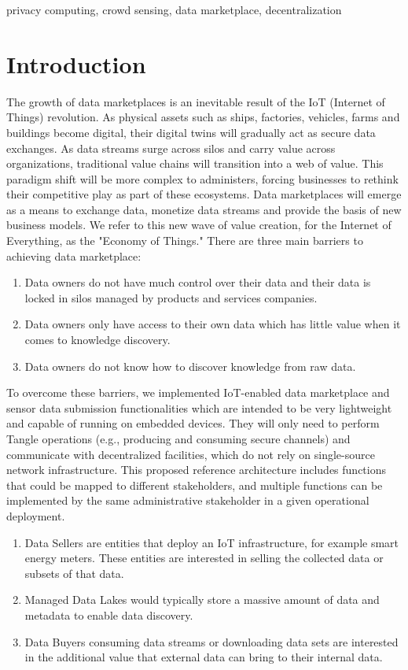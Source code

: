\documentclass[conference]{IEEEtran}
\begin{document}
\begin{IEEEkeywords}
privacy computing, crowd sensing, data marketplace, decentralization
\end{IEEEkeywords}

\section{Introduction}
The growth of data marketplaces is an inevitable result of the IoT (Internet of Things) revolution. As physical assets such as ships, factories, vehicles, farms and buildings become digital, their digital twins will gradually act as secure data exchanges.\cite{digitaltwin, AutonomousDriving} As data streams surge across silos and carry value across organizations, traditional value chains will transition into a web of value. This paradigm shift will be more complex to administers, forcing businesses to rethink their competitive play as part of these ecosystems. Data marketplaces will emerge as a means to exchange data, monetize data streams and provide the basis of new business models. We refer to this new wave of value creation, for the Internet of Everything, as the "Economy of Things." There are three main barriers to achieving data marketplace:
\begin{enumerate}
    \item Data owners do not have much control over their data and their data is locked in silos managed by products and services companies.
    \item Data owners only have access to their own data which has little value when it comes to knowledge discovery.
    \item Data owners do not know how to discover knowledge from raw data.
\end{enumerate}

To overcome these barriers, we implemented IoT-enabled data marketplace and sensor data submission functionalities which are intended to be very lightweight and capable of running on embedded devices. They will only need to perform Tangle operations (e.g., producing and consuming secure channels) and communicate with decentralized facilities, which do not rely on single-source network infrastructure. This proposed reference architecture includes functions that could be mapped to different stakeholders, and multiple functions can be implemented by the same administrative stakeholder in a given operational deployment.
\begin{enumerate}
    \item Data Sellers are entities that deploy an IoT infrastructure, for example smart energy meters. These entities are interested in selling the collected data or subsets of that data.
    \item Managed Data Lakes would typically store a massive amount of data and metadata to enable data discovery.
    \item Data Buyers consuming data streams or downloading data sets are interested in the additional value that external data can bring to their internal data.
\end{enumerate}
\end{document}
